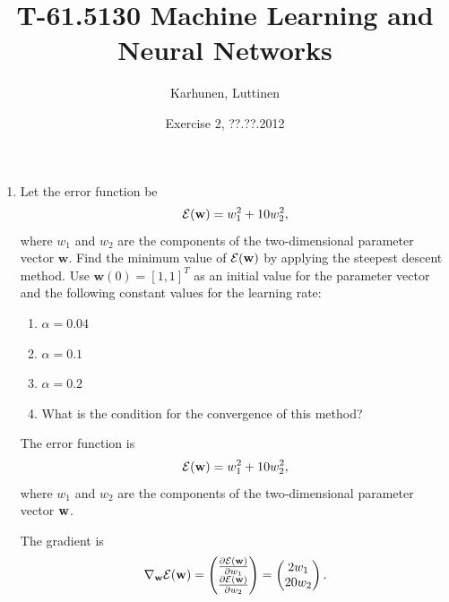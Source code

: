 
\title{T-61.5130 Machine Learning and Neural Networks}
\author{Karhunen, Luttinen}
\date{Exercise 2, ??.??.2012}


\newcommand{\vect}[1]{{\bf{#1}}}
\newcommand{\svect}[1]{\boldsymbol{#1}}
\newcommand{\matr}[1]{\boldsymbol{#1}}
\newcommand{\vw}{{\bf{w}}}
\newcommand{\ve}{{\bf{e}}}
\newcommand{\vx}{{\bf{x}}}



\maketitle

\begin{enumerate}

\item Let the error function be
  \begin{equation*}
    {\cal E}(\mathbf{w})=w_1^2+10w_2^2,
  \end{equation*}
  where $w_1$ and $w_2$ are the components of the two-dimensional
  parameter vector $\mathbf{w}$. Find the minimum value of ${\cal
    E}(\mathbf{w})$ by applying the steepest descent method. Use
  $\mathbf{w}(0)=[1,1]^T$ as an initial value for the parameter vector
  and the following constant values for the learning rate:
  \begin{enumerate} \item $\alpha=0.04$ \item $\alpha=0.1$ \item
    $\alpha=0.2$
  \item What is the condition for the convergence of this method?
  \end{enumerate}

  \begin{solution}

    The error function is
    \begin{equation*}
      {\cal E}(\vw)=w_1^2+10w_2^2,
    \end{equation*}
    where $w_1$ and $w_2$ are the components of the two-dimensional
    parameter vector $\vw$. 

    The gradient is
    \begin{equation*}
      \nabla_{\vw} {\cal E} (\vw) = \begin{pmatrix} \frac{\partial {\cal E}
          (\vw)}{\partial w_1} \\  \frac{\partial  {\cal E} (\vw) }{\partial
          w_2}\end{pmatrix} = \begin{pmatrix} 2 w_1 \\  20 w_2 \end{pmatrix}.
    \end{equation*}


\end{solution}
\end{enumerate}
